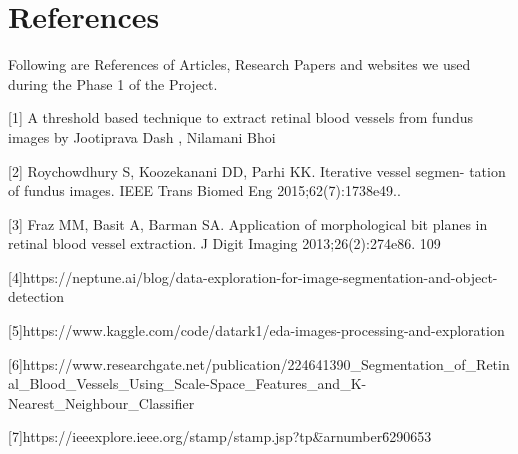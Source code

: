 \documentclass{article}
\begin{document}
\section*{References}
Following are References of Articles, Research Papers and websites we used during the Phase 1 of the Project.
\medskip


{
\small


[1] A threshold based technique to extract retinal blood vessels from fundus images by Jootiprava Dash , Nilamani Bhoi

[2] Roychowdhury S, Koozekanani DD, Parhi KK. Iterative vessel segmen-
tation of fundus images. IEEE Trans Biomed Eng 2015;62(7):1738e49..

[3] Fraz MM, Basit A, Barman SA. Application of morphological bit planes
in retinal blood vessel extraction. J Digit Imaging 2013;26(2):274e86.
109

[4]https://neptune.ai/blog/data-exploration-for-image-segmentation-and-object-detection

[5]https://www.kaggle.com/code/datark1/eda-images-processing-and-exploration

[6]https://www.researchgate.net/publication/224641390\_Segmentation\_of\_Retinal\_Blood\_Vessels\_Using\_Scale-Space\_Features\_and\_K-Nearest\_Neighbour\_Classifier

[7]https://ieeexplore.ieee.org/stamp/stamp.jsp?tp\=\&arnumber\=6290653

}
\end{document}

